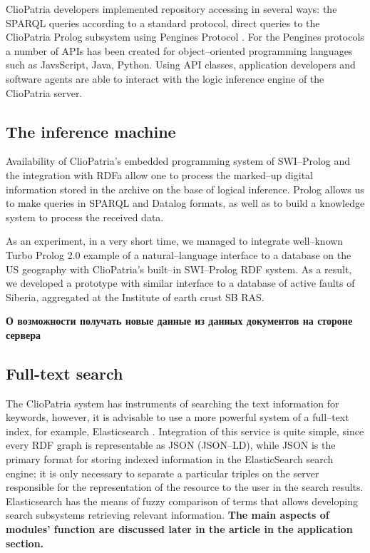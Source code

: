 \documentclass[conference,a4paper]{IEEEtran}
\begin{document}
ClioPatria developers implemented repository accessing in several ways: the SPARQL queries according to a standard protocol, direct queries to the ClioPatria Prolog subsystem using Pengines Protocol \cite{b9}.  For the Pengines protocols a number of APIs has been created for object--oriented programming languages such as JavsScript, Java, Python.  Using API classes, application developers and software agents are able to interact with the logic inference engine of the ClioPatria server.

\subsection{The inference machine}

Availability of ClioPatria's embedded programming system of SWI--Prolog \cite{b10} and the integration with RDFa allow one to process the marked--up digital information stored in the archive on the base of logical inference.  Prolog allows us to make queries in SPARQL and Datalog formats, as well as to build a knowledge system to process the received data.

As an experiment, in a very short time, we managed to integrate well--known Turbo Prolog 2.0 example of a natural--language interface to a database on the US geography with ClioPatria's built--in SWI--Prolog RDF system.  As a result, we developed a prototype with similar interface to a database of active faults of Siberia, aggregated at the Institute of earth crust SB RAS.

\textbf{О возможности получать новые данные из данных документов на стороне сервера}

\subsection{Full-text search}

The ClioPatria system has instruments of searching the text information for keywords, however, it is advisable to use a more powerful system of a full--text index, for example, Elasticsearch \cite{b13}.  Integration of this service is quite simple, since every RDF graph is representable as JSON (JSON--LD), while JSON is the primary format for storing indexed information in the ElasticSearch search engine; it is only necessary to separate a particular triples on the server responsible for the representation of the resource to the user in the search results.  Elasticsearch has the means of fuzzy comparison of terms that allows developing search subsystems retrieving relevant information.  \textbf{The main aspects of modules' function are discussed later in the article in the application section.}
\end{document}

